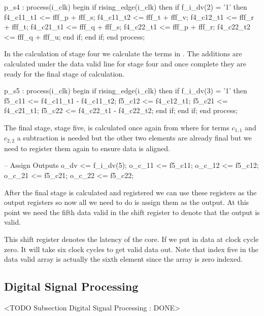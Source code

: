 \begin{VHDLlisting}[tabsize]
p_s4 : process(i_clk)
begin
	if rising_edge(i_clk) then
		if f_i_dv(2) = '1' then
			f4_c11_t1 <= fff_p + fff_s;
		    f4_c11_t2 <= fff_t + fff_v;
		    f4_c12_t1 <= fff_r + fff_t;
		    f4_c21_t1 <= fff_q + fff_s;
		    f4_c22_t1 <= fff_p + fff_r;
		    f4_c22_t2 <= fff_q + fff_u;
		end if;
	end if;
end process;
\end{VHDLlisting}

In the calculation of stage four we calculate the terms in . The additions are calculated under the data valid line for stage four and once complete they are ready for the final stage of calculation. 

\begin{VHDLlisting}[tabsize=2]
p_s5 : process(i_clk)
begin
	if rising_edge(i_clk) then
		if f_i_dv(3) = '1' then
			f5_c11 <= f4_c11_t1 - f4_c11_t2;
		    f5_c12 <= f4_c12_t1;
		    f5_c21 <= f4_c21_t1;
		    f5_c22 <= f4_c22_t1 - f4_c22_t2;
		end if;
	end if;
end process;
\end{VHDLlisting} 

The final stage, stage five, is calculated once again from  where for terms $c_{1,1}$ and $c_{2,2}$ a subtraction is needed but the other two elements are already final but we need to register them again to ensure data is aligned. 

\begin{VHDLlisting}[tabsize=2]
-- Assign Outputs
o_dv   <= f_i_dv(5);
o_c_11 <= f5_c11;
o_c_12 <= f5_c12;
o_c_21 <= f5_c21;
o_c_22 <= f5_c22;
\end{VHDLlisting}

After the final stage is calculated and registered we can use these registers as the output registers so now all we need to do is assign them as the output. At this point we need the fifth data valid in the shift register to denote that the output is valid. 

This shift register denotes the latency of the core. If we put in data at clock cycle zero. It will take six clock cycles to get valid data out. Note that index five in the data valid array is actually the sixth element since the array is zero indexed. 

\subsection{Digital Signal Processing}
	<TODO Subsection Digital Signal Processing : DONE>
	
